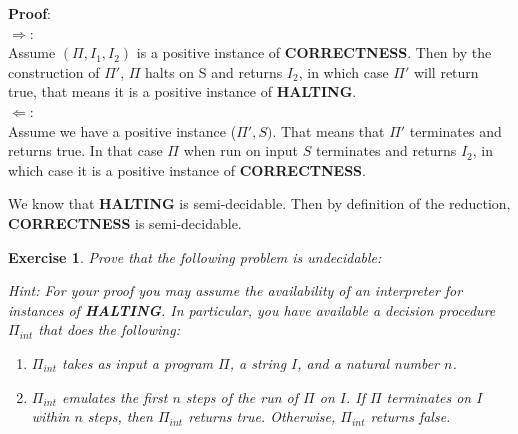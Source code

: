 \documentclass [10pt]{article}
\newtheorem{exercise}[theorem]{Exercise}
\begin{document}
\textbf{Proof}:\\
$\Rightarrow$:\\
Assume $(\Pi, I_1, I_2)$ is a positive instance of \textbf{CORRECTNESS}. Then by the construction of $\Pi'$, $\Pi$ halts on S and returns $I_2$, in which case $\Pi'$ will return true, that means it is a positive instance of \textbf{HALTING}.\\
$\Leftarrow$:\\
Assume we have a positive instance ($\Pi', S)$. That means that $\Pi'$ terminates and returns true. In that case $\Pi$ when run on input $S$ terminates and returns $I_2$, in which case it is a positive instance of \textbf{CORRECTNESS}.

We know that \textbf{HALTING} is semi-decidable. Then by definition of the reduction, \textbf{CORRECTNESS} is semi-decidable.

\begin{exercise}
    Prove that the following problem is undecidable:

  \begin{center}
  \end{center}

  Hint: For your proof you may assume the availability of an interpreter for
  instances of \textbf{HALTING}. In particular, you have available a decision
  procedure $\Pi_{int}$ that does the following:
  \begin{enumerate}\item $\Pi_{int}$ takes as input a program $\Pi$,  a
    string $I$, and a natural number $n$.

  \item $\Pi_{int}$ emulates the first $n$ steps of the run of $\Pi$ on
    $I$. If $\Pi$ terminates on $I$ within $n$ steps, then $\Pi_{int}$ returns
    \emph{true}. Otherwise, $\Pi_{int}$ returns \emph{false}.
  \end{enumerate}

    
\end{exercise}
\end{document}
